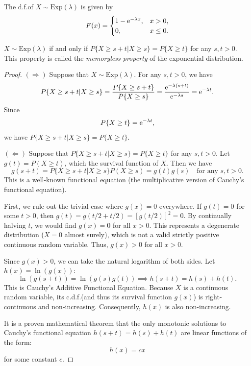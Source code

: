The d.f.\@ of \(X \sim \mathrm{Exp}(\lambda)\) is given by
\[
  F(x) = \begin{cases}
    1 - \mathrm{e}^{-\lambda x}, & x > 0, \\
    0, & x \leq 0.
  \end{cases}
\]

\begin{proposition}
  \(X \sim \mathrm{Exp}(\lambda)\) if and only if \(P\{X \geq s + t | X  \geq s\} = P\{X \geq t\}\) for any \(s, t > 0\). This property is called the \emph{memoryless property} of the exponential distribution.
\end{proposition}

\begin{proof}
  \((\Rightarrow)\) Suppose that \(X \sim \mathrm{Exp}(\lambda)\). For any \(s, t > 0\), we have
  \[
    P\{X \geq s + t | X  \geq s\} = \frac{P\{X \geq s + t\}}{P\{X \geq s\}} = \frac{\mathrm{e}^{-\lambda (s + t)}}{\mathrm{e}^{-\lambda s}} = \mathrm{e}^{-\lambda t}.
  \]
  Since
  \[
    P\{X \geq t\} = \mathrm{e}^{-\lambda t},
  \]
  we have \(P\{X \geq s + t | X  \geq s\} = P\{X \geq t\}\).

  \((\Leftarrow)\) Suppose that \(P\{X \geq s + t | X  \geq s\} = P\{X \geq t\}\) for any \(s, t > 0\). Let \(g(t) = P(X \geq t)\), which the survival function of \(X\). Then we have
  \[
    g(s + t) = P\{X \geq s + t | X  \geq s\} P(X \geq s) = g(t) g(s) \quad \text{for any } s, t > 0.
  \]
  This is a well-known functional equation (the multiplicative version of Cauchy's functional equation). 

  First, we rule out the trivial case where \(g(x) = 0\) everywhere. If \(g(t) = 0\) for some \(t > 0\), then \(g(t) = g(t/2 + t/2) = [g(t/2)]^2 = 0\). By continually halving \(t\), we would find \(g(x)=0\) for all \(x>0\). This represents a degenerate distribution (\(X=0\) almost surely), which is not a valid strictly positive continuous random variable. Thus, \(g(x) > 0\) for all \(x > 0\).

  Since \(g(x) > 0\), we can take the natural logarithm of both sides. Let \(h(x) = \ln(g(x))\):
  \[
    \ln(g(s+t)) = \ln(g(s)g(t)) \implies h(s+t) = h(s) + h(t).
  \]
  This is Cauchy's Additive Functional Equation. Because \(X\) is a continuous random variable, its c.d.f.\@ (and thus its survival function \(g(x)\)) is right-continuous and non-increasing. Consequently, \(h(x)\) is also non-increasing.

  It is a proven mathematical theorem that the only monotonic solutions to Cauchy's functional equation \(h(s+t) = h(s) + h(t)\) are linear functions of the form:
  \[
    h(x) = cx
  \]
  for some constant \(c\).


\end{proof}
